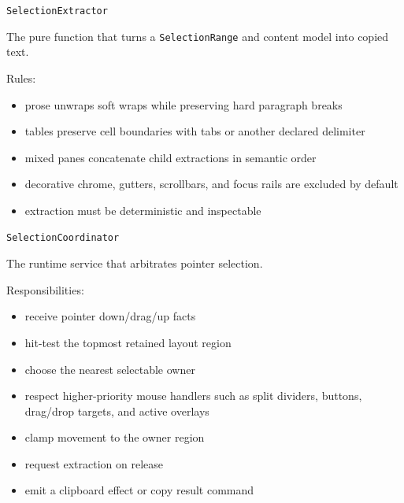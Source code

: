 \texttt{S\allowbreak{}e\allowbreak{}l\allowbreak{}e\allowbreak{}c\allowbreak{}t\allowbreak{}i\allowbreak{}o\allowbreak{}n\allowbreak{}E\allowbreak{}x\allowbreak{}t\allowbreak{}r\allowbreak{}a\allowbreak{}c\allowbreak{}t\allowbreak{}o\allowbreak{}r}

The pure function that turns a \texttt{S\allowbreak{}e\allowbreak{}l\allowbreak{}e\allowbreak{}c\allowbreak{}t\allowbreak{}i\allowbreak{}o\allowbreak{}n\allowbreak{}R\allowbreak{}a\allowbreak{}n\allowbreak{}g\allowbreak{}e} and content model into copied text.

Rules:

\begin{itemize}
\tightlist
\item
  prose unwraps soft wraps while preserving hard paragraph breaks
\item
  tables preserve cell boundaries with tabs or another declared delimiter
\item
  mixed panes concatenate child extractions in semantic order
\item
  decorative chrome, gutters, scrollbars, and focus rails are excluded by default
\item
  extraction must be deterministic and inspectable
\end{itemize}

\texttt{S\allowbreak{}e\allowbreak{}l\allowbreak{}e\allowbreak{}c\allowbreak{}t\allowbreak{}i\allowbreak{}o\allowbreak{}n\allowbreak{}C\allowbreak{}o\allowbreak{}o\allowbreak{}r\allowbreak{}d\allowbreak{}i\allowbreak{}n\allowbreak{}a\allowbreak{}t\allowbreak{}o\allowbreak{}r}

The runtime service that arbitrates pointer selection.

Responsibilities:

\begin{itemize}
\tightlist
\item
  receive pointer down/drag/up facts
\item
  hit-test the topmost retained layout region
\item
  choose the nearest selectable owner
\item
  respect higher-priority mouse handlers such as split dividers, buttons, drag/drop targets, and active overlays
\item
  clamp movement to the owner region
\item
  request extraction on release
\item
  emit a clipboard effect or copy result command
\end{itemize}

